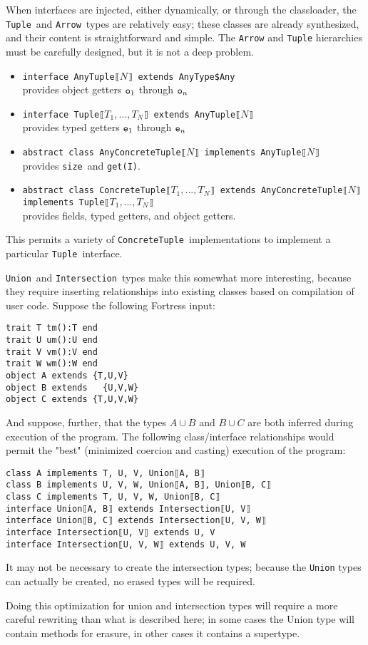 \documentclass[11pt]{article}
\makeatletter
\def\LOBR{\mbox{\fontspec{Code2000}⟦}}
\def\ROBR{\mbox{\fontspec{Code2000}⟧}}
\newcommand{\jvm}[1]{{\tt #1}}
\newcommand{\slantverbatim}{\def\verbatim@font{\slshape\ttfamily\hyphenchar\font\m@ne\@noligs}}
\makeatother
\begin{document}
When interfaces are injected, either dynamically, or through the classloader, the
\jvm{Tuple}\ and \jvm{Arrow}\ types are relatively easy; these classes are already synthesized,
and their content is straightforward and simple.
The \jvm{Arrow} and \jvm{Tuple} hierarchies must be carefully designed, but it is not a deep problem.
\begin{itemize}
\item \jvm{interface AnyTuple\LOBR $N$\ROBR\ extends AnyType\$Any}\\provides object getters $\jvm{o}_1$ through $\jvm{o}_n$
\item \jvm{interface Tuple\LOBR$T_1,...,T_N$\ROBR\ extends AnyTuple\LOBR $N$\ROBR}\\provides typed getters $\jvm{e}_1$ through $\jvm{e}_n$
\item \jvm{abstract class AnyConcreteTuple\LOBR$N$\ROBR\ implements AnyTuple\LOBR $N$\ROBR}\\provides \jvm{size}\ and \jvm{get(I)}.
\item \jvm{abstract class ConcreteTuple\LOBR$T_1,...,T_N$\ROBR\ extends AnyConcreteTuple\LOBR $N$\ROBR\\implements Tuple\LOBR$T_1,...,T_N$\ROBR}\\provides fields, typed getters, and object getters.
\end{itemize}
This permits a variety of \jvm{ConcreteTuple}\ implementations to implement a particular \jvm{Tuple}\ interface.

\jvm{Union}\ and \jvm{Intersection}\ types make this somewhat more interesting,
because they require inserting relationships into existing classes based on compilation of user code.
Suppose the following Fortress input:
{\slantverbatim
\begin{verbatim}
trait T tm():T end
trait U um():U end
trait V vm():V end
trait W wm():W end
object A extends {T,U,V}
object B extends   {U,V,W}
object C extends {T,U,V,W}
\end{verbatim}
}

And suppose, further, that the types $A\cup B$ and $B\cup C$ are both inferred during execution of the program.
The following class/interface relationships would permit the "best" (minimized coercion and casting) execution of the program:
\begin{verbatim}
class A implements T, U, V, Union⟦A, B⟧
class B implements U, V, W, Union⟦A, B⟧, Union⟦B, C⟧
class C implements T, U, V, W, Union⟦B, C⟧
interface Union⟦A, B⟧ extends Intersection⟦U, V⟧
interface Union⟦B, C⟧ extends Intersection⟦U, V, W⟧
interface Intersection⟦U, V⟧ extends U, V
interface Intersection⟦U, V, W⟧ extends U, V, W
\end{verbatim}
It may not be necessary to create the intersection types; because the \jvm{Union} types can actually be created, no erased types will be required.

Doing this optimization for union and intersection types will require a more careful rewriting than what is described here; in some cases the Union type will contain methods for erasure, in other cases it contains a supertype.
\end{document}
